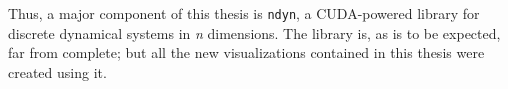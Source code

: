 \documentclass{article}
\theoremstyle{plain}
\theoremstyle{definition}
\begin{document}
Thus, a major component of this thesis is \texttt{ndyn}, a CUDA-powered library for discrete dynamical systems in \emph{n} dimensions. The library is, as is to be expected, far from complete; but all the new visualizations contained in this thesis were created using it.


\end{document}
